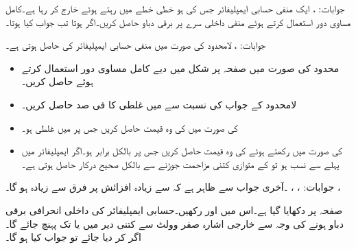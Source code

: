 جوابات: ، 
ایک منفی حسابی ایمپلیفائر جس کی  ہو خطی خطے میں رہتے ہوئے  خارج کر رہا ہے۔کامل مساوی دور استعمال کرتے ہوئے منفی داخلی سرے  پر برقی دباو حاصل کریں۔اگر  ہوتا تب جواب کیا ہوتا۔
	
جوابات: ،   
لامحدود  کی صورت میں منفی حسابی ایمپلیفائر کی  حاصل ہوتی ہے۔
\begin{itemize}
\item
محدود   کی صورت میں صفحہ  پر شکل  میں دیے  کامل مساوی دور استعمال کرتے ہوئے  حاصل کریں۔ 
\item
لامحدود  کے جواب کی نسبت سے  میں غلطی کا فی صد حاصل کریں۔
\item
{} کی صورت میں  کی وہ قیمت حاصل کریں جس پر  میں غلطی ہو۔
\item
{} کی صورت میں  رکھتے ہوئے  کی وہ قیمت حاصل کریں جس پر  بالکل برابر  ہو۔اگر ایمپلیفائر میں  پہلے سے نسب ہو تو  کے متوازی کتنی مزاحمت جوڑنے سے  بالکل صحیح درکار  حاصل ہوتی ہے۔

\end{itemize}

جوابات: ،  ، ۔آخری جواب سے ظاہر ہے کہ  سے زیادہ افزائش پر فرق  سے زیادہ ہو گا۔ ، 

صفحہ  پر  دکھایا گیا ہے۔اس میں  اور  رکھیں۔حسابی ایمپلیفائر کی داخلی انحرافی برقی دباو  ہونے کی وجہ سے خارجی اشارہ صفر وولٹ سے کتنی دیر میں  یا  تک پہنچ جائے گا۔اگر   کر دیا جائے تو جواب کیا ہو گا۔

